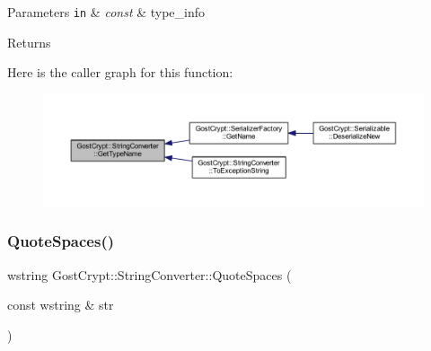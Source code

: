 \begin{DoxyParams}[1]{Parameters}
\mbox{\tt in}  & {\em const} & type\+\_\+info \\
\hline
\end{DoxyParams}
\begin{DoxyReturn}{Returns}

\end{DoxyReturn}
Here is the caller graph for this function\+:
\nopagebreak
\begin{figure}[H]
\begin{center}
\leavevmode
\includegraphics[width=350pt]{class_gost_crypt_1_1_string_converter_a8f57ff107fac8c923470014d26b9681b_icgraph}
\end{center}
\end{figure}
\mbox{\label{class_gost_crypt_1_1_string_converter_a1dc1f215db66d2a4bb4d0b907513934f}} 
\subsubsection{\texorpdfstring{Quote\+Spaces()}{QuoteSpaces()}}
{\footnotesize\ttfamily wstring Gost\+Crypt\+::\+String\+Converter\+::\+Quote\+Spaces (\begin{DoxyParamCaption}\item[{const wstring \&}]{str }\end{DoxyParamCaption})\hspace{0.3cm}{\ttfamily [static]}}


